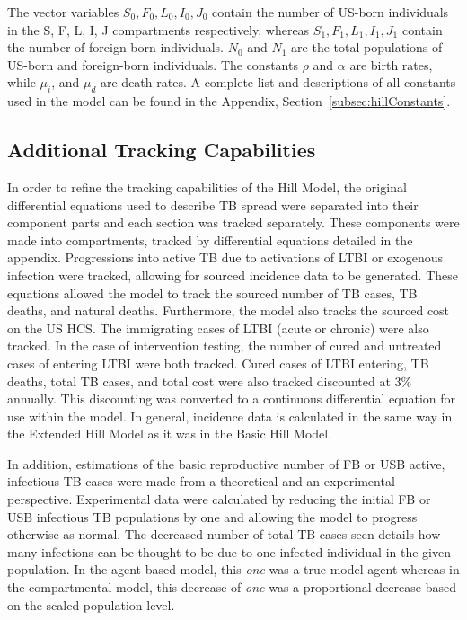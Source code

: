\documentclass{amsart}
\begin{document}
The vector variables $S_0, F_0, L_0, I_0, J_0$ contain the number of US-born
individuals in the S, F, L, I, J compartments respectively, whereas $S_1, F_1,
L_1, I_1, J_1$ contain the number of foreign-born individuals. $N_0$ and $N_1$
are the total populations of US-born and foreign-born individuals.  The
constants $\rho$ and $\alpha$ are birth rates, while $\mu_i$, and $\mu_d$ are
death rates. A complete list and descriptions of all constants used in the model
can be found in the Appendix, Section~\ref{subsec:hillConstants}.

\subsection{Additional Tracking Capabilities}
In order to refine the tracking capabilities of the Hill Model, the original
differential equations used to describe TB spread were separated into their
component parts and each section was tracked separately.
These components were made into compartments, tracked by differential equations
detailed in the appendix. Progressions into active TB due to activations of LTBI
or exogenous infection were tracked, allowing for sourced incidence data to be
generated. These equations allowed the model to track the sourced number of TB
cases, TB deaths, and natural deaths. Furthermore, the model also tracks the
sourced cost on the US HCS. The immigrating cases of LTBI (acute or chronic)
were also tracked. In the case of intervention testing, the number of cured and
untreated cases of entering LTBI were both tracked. Cured cases of LTBI
entering, TB deaths, total TB cases, and total cost were also tracked discounted
at 3\% annually. This discounting was converted to a continuous differential
equation for use within the model. In general, incidence data is calculated in
the same way in the Extended Hill Model as it was in the Basic Hill Model.

In addition, estimations of the basic reproductive number of FB or USB active,
infectious TB cases were made from a theoretical and an experimental
perspective. Experimental data were calculated by reducing the initial
FB or USB infectious TB populations by one and allowing the
model to progress otherwise as normal. The decreased number of total TB cases
seen details how many infections can be thought to be due to one infected
individual in the given population. In the agent-based model, this \emph{one}
was a true model agent whereas in the compartmental model, this decrease of
\emph{one} was a proportional decrease based on the scaled population level. 
\end{document}
